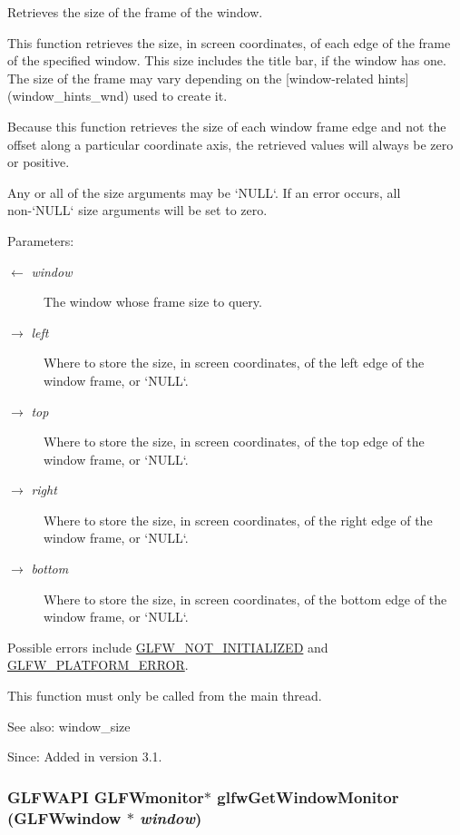 Retrieves the size of the frame of the window. 

This function retrieves the size, in screen coordinates, of each edge of the frame of the specified window. This size includes the title bar, if the window has one. The size of the frame may vary depending on the \mbox{[}window-related hints\mbox{]}(window\_\-hints\_\-wnd) used to create it.

Because this function retrieves the size of each window frame edge and not the offset along a particular coordinate axis, the retrieved values will always be zero or positive.

Any or all of the size arguments may be `NULL`. If an error occurs, all non-`NULL` size arguments will be set to zero.

\begin{Desc}
\item[Parameters:]
\begin{description}
\item[\mbox{$\leftarrow$} {\em window}]The window whose frame size to query. \item[\mbox{$\rightarrow$} {\em left}]Where to store the size, in screen coordinates, of the left edge of the window frame, or `NULL`. \item[\mbox{$\rightarrow$} {\em top}]Where to store the size, in screen coordinates, of the top edge of the window frame, or `NULL`. \item[\mbox{$\rightarrow$} {\em right}]Where to store the size, in screen coordinates, of the right edge of the window frame, or `NULL`. \item[\mbox{$\rightarrow$} {\em bottom}]Where to store the size, in screen coordinates, of the bottom edge of the window frame, or `NULL`.\end{description}
\end{Desc}
Possible errors include \hyperlink{group__errors_g2374ee02c177f12e1fa76ff3ed15e14a}{GLFW\_\-NOT\_\-INITIALIZED} and \hyperlink{group__errors_gd44162d78100ea5e87cdd38426b8c7a1}{GLFW\_\-PLATFORM\_\-ERROR}.

This function must only be called from the main thread.

\begin{Desc}
\item[See also:]window\_\-size\end{Desc}
\begin{Desc}
\item[Since:]Added in version 3.1. \end{Desc}
\hypertarget{group__window_gf1525cb3bccd5789c702cc9676ef3403}{
\subsubsection[glfwGetWindowMonitor]{\setlength{\rightskip}{0pt plus 5cm}GLFWAPI {\bf GLFWmonitor}$\ast$ glfwGetWindowMonitor ({\bf GLFWwindow} $\ast$ {\em window})}}
\label{group__window_gf1525cb3bccd5789c702cc9676ef3403}


